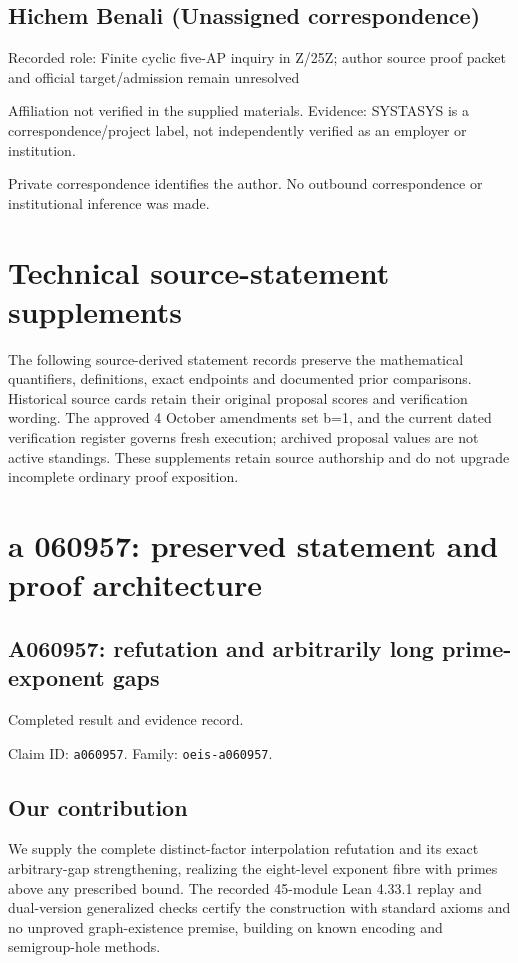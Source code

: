\documentclass[11pt,a4paper]{article}
\begin{document}
\subsection{Hichem Benali (Unassigned correspondence)}
Recorded role: Finite cyclic five-AP inquiry in Z/25Z; author source proof packet and official target/admission remain unresolved

Affiliation not verified in the supplied materials. Evidence: SYSTASYS is a correspondence/project label, not independently verified as an employer or institution.

Private correspondence identifies the author. No outbound correspondence or institutional inference was made.

\clearpage
\section{Technical source-statement supplements}
The following source-derived statement records preserve the mathematical quantifiers, definitions, exact endpoints and documented prior comparisons. Historical source cards retain their original proposal scores and verification wording. The approved 4 October amendments set b=1, and the current dated verification register governs fresh execution; archived proposal values are not active standings. These supplements retain source authorship and do not upgrade incomplete ordinary proof exposition.

\clearpage
\section{a 060957: preserved statement and proof architecture}
\subsection{A060957: refutation and arbitrarily long prime-exponent gaps}
Completed result and evidence record.

Claim ID: \texttt{a060957}. Family: \texttt{oeis-a060957}.

\subsection{Our contribution}
We supply the complete distinct-factor interpolation refutation and its exact arbitrary-gap strengthening, realizing the eight-level exponent fibre with primes above any prescribed bound. The recorded 45-module Lean 4.33.1 replay and dual-version generalized checks certify the construction with standard axioms and no unproved graph-existence premise, building on known encoding and semigroup-hole methods.
\end{document}
